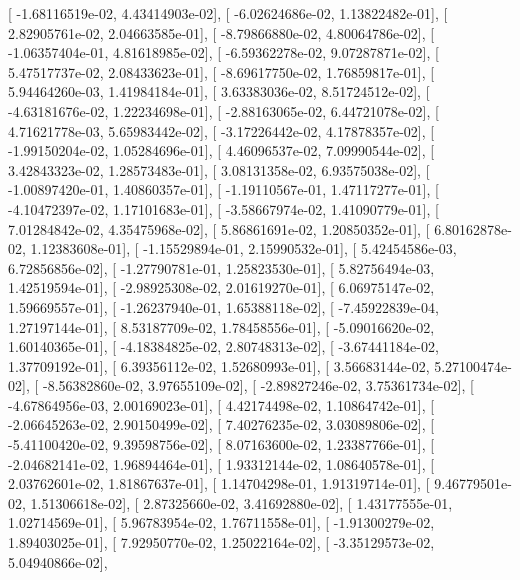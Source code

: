 \documentclass{article}
\begin{document}
       [ -1.68116519e-02,   4.43414903e-02],
       [ -6.02624686e-02,   1.13822482e-01],
       [  2.82905761e-02,   2.04663585e-01],
       [ -8.79866880e-02,   4.80064786e-02],
       [ -1.06357404e-01,   4.81618985e-02],
       [ -6.59362278e-02,   9.07287871e-02],
       [  5.47517737e-02,   2.08433623e-01],
       [ -8.69617750e-02,   1.76859817e-01],
       [  5.94464260e-03,   1.41984184e-01],
       [  3.63383036e-02,   8.51724512e-02],
       [ -4.63181676e-02,   1.22234698e-01],
       [ -2.88163065e-02,   6.44721078e-02],
       [  4.71621778e-03,   5.65983442e-02],
       [ -3.17226442e-02,   4.17878357e-02],
       [ -1.99150204e-02,   1.05284696e-01],
       [  4.46096537e-02,   7.09990544e-02],
       [  3.42843323e-02,   1.28573483e-01],
       [  3.08131358e-02,   6.93575038e-02],
       [ -1.00897420e-01,   1.40860357e-01],
       [ -1.19110567e-01,   1.47117277e-01],
       [ -4.10472397e-02,   1.17101683e-01],
       [ -3.58667974e-02,   1.41090779e-01],
       [  7.01284842e-02,   4.35475968e-02],
       [  5.86861691e-02,   1.20850352e-01],
       [  6.80162878e-02,   1.12383608e-01],
       [ -1.15529894e-01,   2.15990532e-01],
       [  5.42454586e-03,   6.72856856e-02],
       [ -1.27790781e-01,   1.25823530e-01],
       [  5.82756494e-03,   1.42519594e-01],
       [ -2.98925308e-02,   2.01619270e-01],
       [  6.06975147e-02,   1.59669557e-01],
       [ -1.26237940e-01,   1.65388118e-02],
       [ -7.45922839e-04,   1.27197144e-01],
       [  8.53187709e-02,   1.78458556e-01],
       [ -5.09016620e-02,   1.60140365e-01],
       [ -4.18384825e-02,   2.80748313e-02],
       [ -3.67441184e-02,   1.37709192e-01],
       [  6.39356112e-02,   1.52680993e-01],
       [  3.56683144e-02,   5.27100474e-02],
       [ -8.56382860e-02,   3.97655109e-02],
       [ -2.89827246e-02,   3.75361734e-02],
       [ -4.67864956e-03,   2.00169023e-01],
       [  4.42174498e-02,   1.10864742e-01],
       [ -2.06645263e-02,   2.90150499e-02],
       [  7.40276235e-02,   3.03089806e-02],
       [ -5.41100420e-02,   9.39598756e-02],
       [  8.07163600e-02,   1.23387766e-01],
       [ -2.04682141e-02,   1.96894464e-01],
       [  1.93312144e-02,   1.08640578e-01],
       [  2.03762601e-02,   1.81867637e-01],
       [  1.14704298e-01,   1.91319714e-01],
       [  9.46779501e-02,   1.51306618e-02],
       [  2.87325660e-02,   3.41692880e-02],
       [  1.43177555e-01,   1.02714569e-01],
       [  5.96783954e-02,   1.76711558e-01],
       [ -1.91300279e-02,   1.89403025e-01],
       [  7.92950770e-02,   1.25022164e-02],
       [ -3.35129573e-02,   5.04940866e-02],
\end{document}
